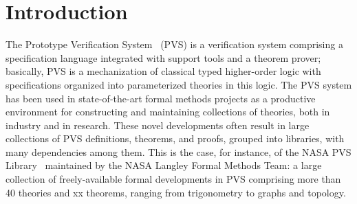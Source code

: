 \section{Introduction}
\label{sec.intro}


The Prototype Verification System~\cite{pvs-cade92} (PVS) is a
verification system comprising a specification language integrated
with support tools and a theorem prover; basically, PVS is a
mechanization of classical typed higher-order logic with
specifications organized into parameterized theories in this logic.
The PVS system has been used in state-of-the-art formal methods
projects as a productive environment for constructing and maintaining
collections of theories, both in industry and in research. These novel
developments often result in large collections of PVS definitions,
theorems, and proofs, grouped into libraries, with many dependencies
among them. This is the case, for instance, of the NASA PVS
Library~\cite{nasalib} maintained by the NASA Langley Formal Methods
Team: a large collection of freely-available formal developments in
PVS comprising more than 40 theories and xx theorems, ranging from
trigonometry to graphs and topology.
